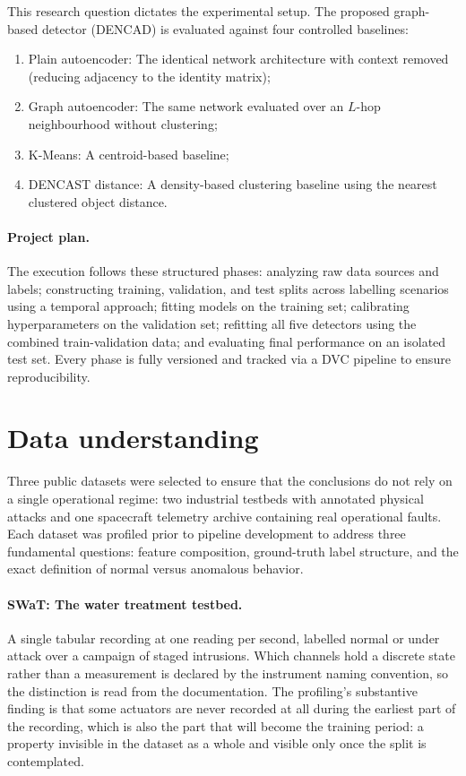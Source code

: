 \documentclass{article}
\begin{document}
This research question dictates the experimental setup. The proposed graph-based detector (DENCAD) is evaluated against four controlled baselines:
\begin{enumerate}
    \item Plain autoencoder: The identical network architecture with context removed (reducing adjacency to the identity matrix);
    \item Graph autoencoder: The same network evaluated over an $L$-hop neighbourhood without clustering;
    \item K-Means: A centroid-based baseline;
    \item DENCAST distance: A density-based clustering baseline using the nearest clustered object distance.
\end{enumerate}

\paragraph{Project plan.} 
The execution follows these structured phases: 
analyzing raw data sources and labels; 
constructing training, validation, and test splits across labelling scenarios using a temporal approach;
fitting models on the training set; 
calibrating hyperparameters on the validation set; 
refitting all five detectors using the combined train-validation data; 
and evaluating final performance on an isolated test set. 
Every phase is fully versioned and tracked via a DVC pipeline to ensure reproducibility.

\section{Data understanding}

Three public datasets were selected to ensure that the conclusions do not rely on a single operational regime:
two industrial testbeds with annotated physical attacks and one spacecraft telemetry archive containing real operational faults. 
Each dataset was profiled prior to pipeline development to address three fundamental questions: 
feature composition, ground-truth label structure, and the exact definition of normal versus anomalous behavior.

\paragraph{SWaT: The water treatment testbed.} A single tabular recording at one reading per
second, labelled normal or under attack over a campaign of staged intrusions. Which
channels hold a discrete state rather than a measurement is declared by the instrument
naming convention, so the distinction is read from the documentation.
The profiling's substantive finding is
that some actuators are never recorded at all during the earliest part of the recording,
which is also the part that will become the training period: a property invisible in the
dataset as a whole and visible only once the split is contemplated.
\end{document}
